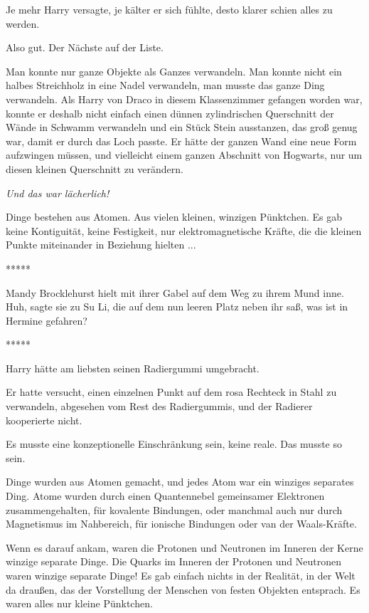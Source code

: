 Je mehr Harry versagte, je kälter er sich fühlte, desto klarer schien alles zu
werden.

Also gut. Der Nächste auf der Liste.

Man konnte nur ganze Objekte als Ganzes verwandeln. Man konnte nicht ein halbes
Streichholz in eine Nadel verwandeln, man musste das ganze Ding verwandeln. Als
Harry von Draco in diesem Klassenzimmer gefangen worden war, konnte er deshalb
nicht einfach einen dünnen zylindrischen Querschnitt der Wände in Schwamm
verwandeln und ein Stück Stein ausstanzen, das groß genug war, damit er durch
das Loch passte. Er hätte der ganzen Wand eine neue Form aufzwingen müssen, und
vielleicht einem ganzen Abschnitt von Hogwarts, nur um diesen kleinen
Querschnitt zu verändern.

\emph{Und das war lächerlich!}

Dinge bestehen aus Atomen. Aus vielen kleinen, winzigen Pünktchen. Es gab keine
Kontiguität, keine Festigkeit, nur elektromagnetische Kräfte, die die kleinen
Punkte miteinander in Beziehung hielten ...

\begin{center}*****\end{center}

Mandy Brocklehurst hielt mit ihrer Gabel auf dem Weg zu ihrem Mund inne.
\glqq{}Huh\grqq{}, sagte sie zu Su Li, die auf dem nun leeren Platz neben ihr
saß, \glqq{}was ist in Hermine gefahren?\grqq{}

\begin{center}*****\end{center}

Harry hätte am liebsten seinen Radiergummi umgebracht.

Er hatte versucht, einen einzelnen Punkt auf dem rosa Rechteck in Stahl zu
verwandeln, abgesehen vom Rest des Radiergummis, und der Radierer kooperierte
nicht.

Es musste eine konzeptionelle Einschränkung sein, keine reale. Das musste so
sein.

Dinge wurden aus Atomen gemacht, und jedes Atom war ein winziges separates Ding.
Atome wurden durch einen Quantennebel gemeinsamer Elektronen zusammengehalten,
für kovalente Bindungen, oder manchmal auch nur durch Magnetismus im Nahbereich,
für ionische Bindungen oder van der Waals-Kräfte.

Wenn es darauf ankam, waren die Protonen und Neutronen im Inneren der Kerne
winzige separate Dinge. Die Quarks im Inneren der Protonen und Neutronen waren
winzige separate Dinge! Es gab einfach nichts in der Realität, in der Welt da
draußen, das der Vorstellung der Menschen von festen Objekten entsprach. Es
waren alles nur kleine Pünktchen.

